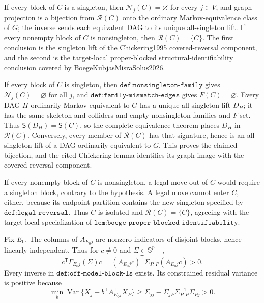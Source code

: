 If every block of \(C\) is a singleton, then \(\mathcal N_j(C)=\varnothing\) for every \(j\in V\), and graph projection is a bijection from \(\mathcal R(C)\) onto the ordinary Markov-equivalence class of \(G\); the inverse sends each equivalent DAG to its unique all-singleton lift.  If every nonempty block of \(C\) is nonsingleton, then \(\mathcal R(C)=\{C\}\).  The first conclusion is the singleton lift of the Chickering1995 covered-reversal component, and the second is the target-local proper-blocked structural-identifiability conclusion covered by BoegeKubjasMisraSolus2026.

If every block of \(C\) is singleton, then \(\texttt{def:nonsingleton-family}\) gives \(\mathcal N_j(C)=\varnothing\) for all \(j\), and \(\texttt{def:family-mismatch-edges}\) gives \(F(C)=\varnothing\).  Every DAG \(H\) ordinarily Markov equivalent to \(G\) has a unique all-singleton lift \(D_H\); it has the same skeleton and colliders and empty nonsingleton families and \(F\)-set.  Thus \(\mathsf S(D_H)=\mathsf S(C)\), so the complete-equivalence theorem places \(D_H\) in \(\mathcal R(C)\).  Conversely, every member of \(\mathcal R(C)\) has that signature, hence is an all-singleton lift of a DAG ordinarily equivalent to \(G\).  This proves the claimed bijection, and the cited Chickering lemma identifies its graph image with the covered-reversal component.

If every nonempty block of \(C\) is nonsingleton, a legal move out of \(C\) would require a singleton block, contrary to the hypothesis.  A legal move cannot enter \(C\), either, because its endpoint partition contains the new singleton specified by \(\texttt{def:legal-reversal}\).  Thus \(C\) is isolated and \(\mathcal R(C)=\{C\}\), agreeing with the target-local specialization of \(\texttt{lem:boege-proper-blocked-identifiability}\).

Fix \(E_0\).  The columns of \(A_{E_0j}\) are nonzero indicators of disjoint blocks, hence linearly independent.  Thus for \(c\ne0\) and \(\Sigma\in\mathbb S^p_{++}\),
\[
 c^{\mathsf T}\Gamma_{E_0j}(\Sigma)c
 =(A_{E_0j}c)^{\mathsf T}\Sigma_{P,P}(A_{E_0j}c)>0.
\]
Every inverse in \(\texttt{def:off-model-block-ls}\) exists.  Its constrained residual variance is positive because
\[
 \min_b\operatorname{Var}\{X_j-b^{\mathsf T}A_{E_0j}^{\mathsf T}X_P\}
 \ge\Sigma_{jj}-\Sigma_{jP}\Sigma_{P,P}^{-1}\Sigma_{Pj}>0.
\]

